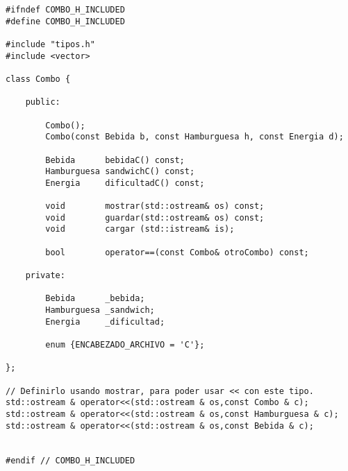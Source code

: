 \begin{lstlisting}
#ifndef COMBO_H_INCLUDED
#define COMBO_H_INCLUDED

#include "tipos.h"
#include <vector>

class Combo {

	public:

		Combo();
		Combo(const Bebida b, const Hamburguesa h, const Energia d);

		Bebida      bebidaC() const;
		Hamburguesa sandwichC() const;
		Energia     dificultadC() const;

		void        mostrar(std::ostream& os) const;
		void        guardar(std::ostream& os) const;
		void        cargar (std::istream& is);

		bool        operator==(const Combo& otroCombo) const;

	private:

		Bebida      _bebida;
		Hamburguesa _sandwich;
		Energia     _dificultad;

		enum {ENCABEZADO_ARCHIVO = 'C'};

};

// Definirlo usando mostrar, para poder usar << con este tipo.
std::ostream & operator<<(std::ostream & os,const Combo & c);
std::ostream & operator<<(std::ostream & os,const Hamburguesa & c);
std::ostream & operator<<(std::ostream & os,const Bebida & c);


#endif // COMBO_H_INCLUDED

\end{lstlisting}